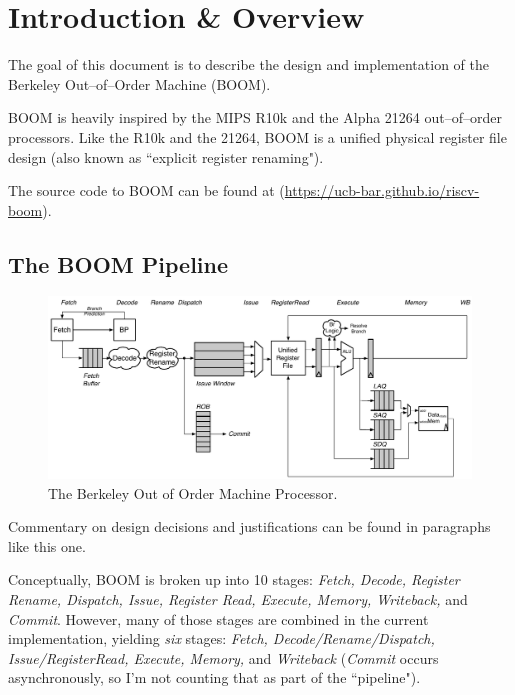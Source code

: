
\chapter{Introduction \& Overview}
\label{sec:introduction}

The goal of this document is to describe the design and implementation of the Berkeley Out--of--Order Machine (BOOM). 


 BOOM is heavily inspired by the MIPS R10k and the Alpha 21264 out--of--order processors\cite{alpha21264, mipsr10k}.  Like the R10k and the 21264, BOOM is a unified physical register file design (also known as ``explicit register renaming"). 
 
 The source code to BOOM can be found at (\url{https://ucb-bar.github.io/riscv-boom}).
 

\section{The BOOM Pipeline}


\begin{figure}[ht]
	\centering
	\centerline{\includegraphics[scale =.9] {figures/boom_stages}}
	\caption{ \small The Berkeley Out of Order Machine Processor.}
	\label{fig:boom_stages}
\end{figure}

\vfill
\begin{commentary}
Commentary on design decisions and justifications can be found in paragraphs like this one.
\end{commentary}

Conceptually, BOOM is broken up into 10 stages: {\em Fetch, Decode, Register Rename, Dispatch, Issue, Register Read, Execute, Memory, Writeback,} and {\em Commit}.  However, many of those stages are combined in the current implementation, yielding {\em six} stages: {\em Fetch, Decode/Rename/Dispatch, Issue/RegisterRead, Execute, Memory,} and {\em Writeback} ({\em Commit} occurs asynchronously, so I'm not counting that as part of the ``pipeline").   

